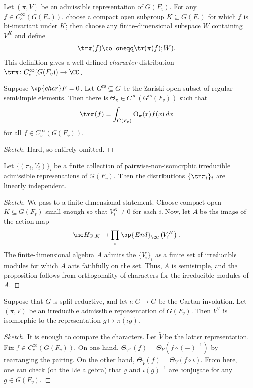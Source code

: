 \documentclass{article}
\begin{document}
\begin{definition}[character]
	Let $(\pi,V)$ be an admissible representation of $G(F_v)$. For any $f\in C_c^\infty(G(F_v))$, choose a compact open subgroup $K\subseteq G(F_v)$ for which $f$ is bi-invariant under $K$; then choose any finite-dimensional subspace $W$ containing $V^K$ and define
	\[\tr\pi(f)\coloneqq\tr(\pi(f);W).\]
	This definition gives a well-defined \textit{character} distribution $\tr\pi\colon C_c^\infty(G(F_v))\to\CC$.
\end{definition}
\begin{theorem}
	Suppose $\op{char}F=0$. Let $G^{\mathrm{rs}}\subseteq G$ be the Zariski open subset of regular semisimple elements. Then there is $\Theta_\pi\in C^\infty(G^{\mathrm{rs}}(F_v))$ such that
	\[\tr\pi(f)=\int_{G(F_v)}\Theta_\pi(x)f(x)\,dx\]
	for all $f\in C_c^\infty(G(F_v))$.
\end{theorem}
\begin{proof}[Sketch]
	Hard, so entirely omitted.
\end{proof}
\begin{proposition}
	Let $\{(\pi_i,V_i)\}_i$ be a finite collection of pairwise-non-isomorphic irreducible admissible represenations of $G(F_v)$. Then the distributions $\{\tr\pi_i\}_i$ are linearly independent.
\end{proposition}
\begin{proof}[Sketch]
	We pass to a finite-dimensional statement. Choose compact open $K\subseteq G(F_v)$ small enough so that $V_i^K\ne0$ for each $i$. Now, let $A$ be the image of the action map
	\[\mc H_{G,K}\to\prod_i\op{End}_\CC\left(V_i^K\right).\]
	The finite-dimensional algebra $A$ admits the $\{V_i\}_i$ as a finite set of irreducible modules for which $A$ acts faithfully on the set. Thus, $A$ is semisimple, and the proposition follows from orthogonality of characters for the irreducible modules of $A$.
\end{proof}
\begin{corollary}
	Suppose that $G$ is split reductive, and let $\iota\colon G\to G$ be the Cartan involution. Let $(\pi,V)$ be an irreducible admissible representation of $G(F_v)$. Then $V^\lor$ is isomorphic to the representation $g\mapsto\pi(\iota g)$.
\end{corollary}
\begin{proof}[Sketch]
	It is enough to compare the characters. Let $\widetilde V$ be the latter representation. Fix $f\in C_c^\infty(G(F_v))$. On one hand, $\Theta_{V^\lor}(f)=\Theta_V\left(f\circ(-)^{-1}\right)$ by rearranging the pairing. On the other hand, $\Theta_{\widetilde V}(f)=\Theta_V(f\circ\iota)$. From here, one can check (on the Lie algebra) that $g$ and $\iota(g)^{-1}$ are conjugate for any $g\in G(F_v)$.
\end{proof}
\end{document}
